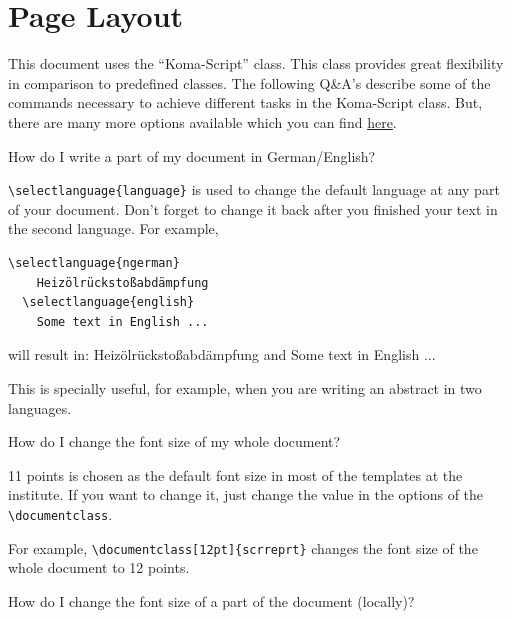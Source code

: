 \section{Page Layout}
\label{sec:PageLayout}
This document uses the ``Koma-Script'' class. This class provides great flexibility in comparison to predefined classes. The following Q\&A's describe some of the commands necessary to achieve different tasks in the Koma-Script class. But, there are many more options available which you can find \href{http://ftp.uni-erlangen.de/ctan/macros/latex/contrib/koma-script/doc/scrguien.pdf}{here}.

\begin{QandA}
\item How do I write a part of my document in German/English?
	
		\begin{answered}
		\verb|\selectlanguage{language}| is used to change the default language at any part of your document. Don't forget to change it back after you finished your text in the second language. For example,
			\begin{lstlisting}[language={[LaTeX]{TeX}},basicstyle=\ttfamily]
  \selectlanguage{ngerman}
	Heizölrückstoßabdämpfung	 	
  \selectlanguage{english}
	Some text in English ...
			\end{lstlisting}
		
		will result in:	
  		Heizölrückstoßabdämpfung
and  	
    	Some text in English ...
    	
    	This is specially useful, for example, when you are writing an abstract in two languages.
			
		\end{answered}	
		
		
		
		
\item How do I change the font size of my whole document?
	
		\begin{answered}
		11 points is chosen as the default font size in most of the templates at the institute. If you want to change it, just change the value in the options of the \verb|\documentclass|. 
		
		For example, \verb|\documentclass[12pt]{scrreprt}| changes the font size of the whole document to 12 points.
		\end{answered}
		
		
		
		
\item How do I change the font size of a part of the document (locally)?
	

\end{QandA}
